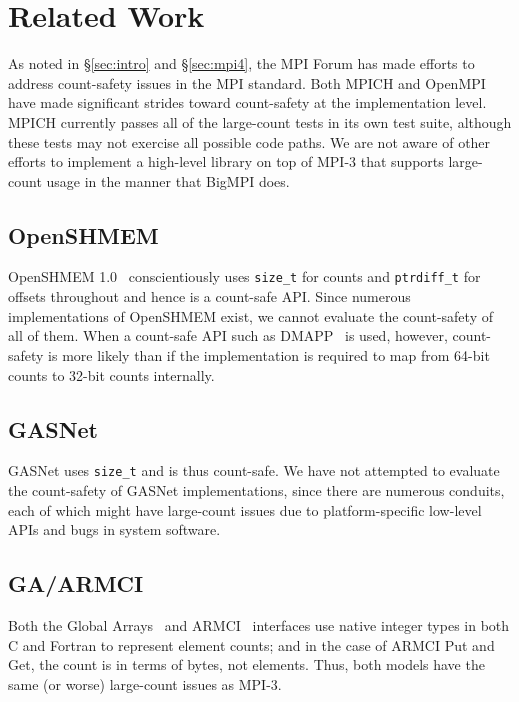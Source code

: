 
\section{Related Work}

As noted in \S\ref{sec:intro} and \S\ref{sec:mpi4}, the MPI Forum has made efforts 
to address count-safety issues in the MPI standard.
Both MPICH and OpenMPI have made significant strides toward count-safety
at the implementation level.  MPICH currently passes all of the large-count tests
in its own test suite, although these tests may not exercise all possible code paths.
We are not aware of other efforts to implement a high-level library on top of
MPI-3 that supports large-count usage in the manner that BigMPI does.

\subsection{OpenSHMEM}

OpenSHMEM 1.0~\cite{kuehn2012openshmem} conscientiously uses \texttt{size\_t} for
counts and \texttt{ptrdiff\_t} for offsets throughout and hence is a count-safe API.
Since numerous implementations of OpenSHMEM exist, we cannot evaluate
the count-safety of all of them.
When a count-safe API such as DMAPP~\cite{DMAPP} is used, however, 
count-safety is more likely
than if the implementation is required to map from 64-bit counts to 32-bit counts internally.

\subsection{GASNet}

GASNet uses \texttt{size\_t} and is thus count-safe.  We have not attempted to evaluate
the count-safety of GASNet implementations, since there are numerous conduits, each of
which might have large-count issues due to platform-specific low-level APIs and
bugs in system software.

\subsection{GA/ARMCI}

Both the Global Arrays~\cite{nieplocha:94} and ARMCI~\cite{nieplocha:99} interfaces
use native integer types in both C and Fortran to represent element counts; and
in the case of ARMCI Put and Get, the count is in terms of bytes, not elements.
Thus, both models have the same (or worse) large-count issues as MPI-3.
